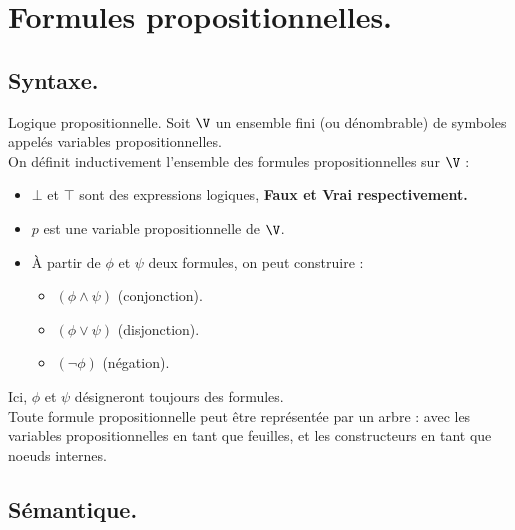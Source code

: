 \documentclass[french, 11pt]{article}
\begin{document}


\section{Formules propositionnelles.}
\subsection{Syntaxe.}

\begin{defi}{Logique propositionnelle.}{}
    Soit $\V$ un ensemble fini (ou dénombrable) de symboles appelés variables propositionnelles.\\
    On définit inductivement l'ensemble des formules propositionnelles sur $\V$ :
    \begin{itemize}[topsep=0pt,itemsep=-0.9 ex]
        \item $\bot$ et $\top$ sont des expressions logiques, \bf{Faux} et \bf{Vrai} respectivement.
        \item $p$ est une variable propositionnelle de $\V$.
        \item À partir de $\phi$ et $\psi$ deux formules, on peut construire : 
        \begin{itemize}[topsep=0pt,itemsep=-0.9 ex]
            \item $(\phi \land \psi)$ (conjonction).
            \item $(\phi \lor \psi)$ (disjonction).
            \item $(\lnot\phi)$ (négation).
        \end{itemize}
    \end{itemize}
    Ici, $\phi$ et $\psi$ désigneront toujours des formules.\\
    Toute formule propositionnelle peut être représentée par un arbre : avec les variables propositionnelles en tant que feuilles, et les constructeurs en tant que noeuds internes.
\end{defi}

\subsection{Sémantique.}
\end{document}
